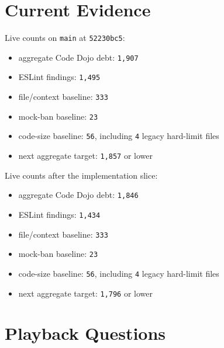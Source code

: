 \section{Current Evidence}\label{record-220-current-evidence}

Live counts on \texttt{m\allowbreak{}a\allowbreak{}i\allowbreak{}n} at \texttt{5\allowbreak{}2\allowbreak{}2\allowbreak{}3\allowbreak{}0\allowbreak{}b\allowbreak{}c\allowbreak{}5}:

\begin{itemize}
\tightlist
\item
  aggregate Code Dojo debt: \texttt{1\allowbreak{},\allowbreak{}9\allowbreak{}0\allowbreak{}7}
\item
  ESLint findings: \texttt{1\allowbreak{},\allowbreak{}4\allowbreak{}9\allowbreak{}5}
\item
  file/context baseline: \texttt{3\allowbreak{}3\allowbreak{}3}
\item
  mock-ban baseline: \texttt{2\allowbreak{}3}
\item
  code-size baseline: \texttt{5\allowbreak{}6}, including \texttt{4} legacy hard-limit files
\item
  next aggregate target: \texttt{1\allowbreak{},\allowbreak{}8\allowbreak{}5\allowbreak{}7} or lower
\end{itemize}

Live counts after the implementation slice:

\begin{itemize}
\tightlist
\item
  aggregate Code Dojo debt: \texttt{1\allowbreak{},\allowbreak{}8\allowbreak{}4\allowbreak{}6}
\item
  ESLint findings: \texttt{1\allowbreak{},\allowbreak{}4\allowbreak{}3\allowbreak{}4}
\item
  file/context baseline: \texttt{3\allowbreak{}3\allowbreak{}3}
\item
  mock-ban baseline: \texttt{2\allowbreak{}3}
\item
  code-size baseline: \texttt{5\allowbreak{}6}, including \texttt{4} legacy hard-limit files
\item
  next aggregate target: \texttt{1\allowbreak{},\allowbreak{}7\allowbreak{}9\allowbreak{}6} or lower
\end{itemize}

\section{Playback Questions}\label{record-220-playback-questions}

